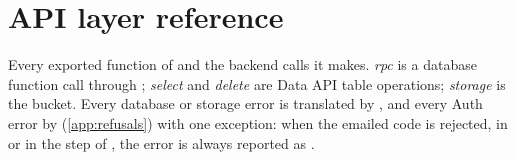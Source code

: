 \chapter{API layer reference}
\label{app:api}

Every exported function of  and the backend calls it makes. \emph{rpc} is a database
function call through ; \emph{select} and \emph{delete} are Data API table operations;
\emph{storage} is the  bucket. Every database or storage error is translated by
, and every Auth error by  (\cref{app:refusals}) with one
exception: when the emailed code is rejected, in  or in the  step
of , the error is always reported as .

